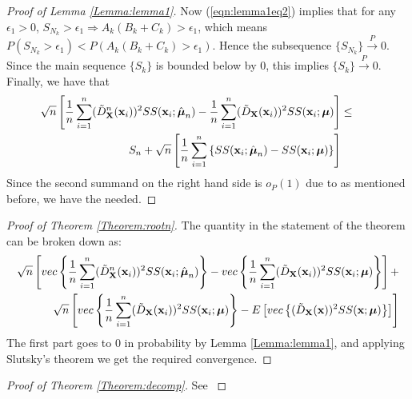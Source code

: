 \documentclass[fleqn,11pt]{article}
\begin{document}
\begin{proof}[Proof of Lemma \ref{Lemma:lemma1}]
Now (\ref{eqn:lemma1eq2}) implies that for any $\epsilon_1 > 0$, $S_{N_k} > \epsilon_1 \Rightarrow A_k (B_k + C_k) > \epsilon_1$, which means $ P(S_{N_k} > \epsilon_1) < P(A_k (B_k + C_k) > \epsilon_1)$. Hence the subsequence $\{S_{N_k}\} \stackrel{P}{\rightarrow} 0$. Since the main sequence $\{S_k\}$ is bounded below by 0, this implies $\{S_k\} \stackrel{P}{\rightarrow} 0$. Finally, we have that
%
\begin{eqnarray}
\sqrt n \left[
\frac{1}{n} \sum_{i=1}^n (\tilde D^n_{\mathbf{X}} ({\bf{x}}_i))^2 SS({\bf{x}}_i; \hat{{\boldsymbol{\mu}}}_n) -
\frac{1}{n} \sum_{i=1}^n (\tilde D_{\mathbf{X}} ({\bf{x}}_i))^2 SS({\bf{x}}_i; {\boldsymbol{\mu}}) \right] &\leq & \hspace{1em} \notag\\
S_n +  \sqrt{n} \left[ \frac{1}{n} \sum_{i=1}^{n} \left\{ SS({\bf{x}}_i; \hat{{\boldsymbol{\mu}}}_{n}) - SS({\bf{x}}_i; {\boldsymbol{\mu}}) \right\} \right] &&
\end{eqnarray}
%
Since the second summand on the right hand side is $o_P(1)$ due to \cite{durre14} as mentioned before, we have the needed.
\end{proof}

\begin{proof}[Proof of Theorem \ref{Theorem:rootn}]
The quantity in the statement of the theorem can be broken down as:
%
\begin{eqnarray*}
\sqrt n \left[ vec\left\{ \frac{1}{n} \sum_{i=1}^n (\tilde D^n_{\mathbf{X}} ({\bf{x}}_i))^2 SS({\bf{x}}_i; \hat{{\boldsymbol{\mu}}}_n) \right\} - vec\left\{ \frac{1}{n} \sum_{i=1}^n (\tilde D_{\mathbf{X}} ({\bf{x}}_i))^2 SS({\bf{x}}_i; {\boldsymbol{\mu}}) \right\} \right] +\\
\sqrt n \left[ vec\left\{ \frac{1}{n} \sum_{i=1}^n (\tilde D_{\mathbf{X}} ({\bf{x}}_i))^2 SS({\bf{x}}_i; {\boldsymbol{\mu}}) \right\} - E \left[ vec\left\{ (\tilde D_{\mathbf{X}} ({\bf{x}}))^2 SS({\bf{x}}; {\boldsymbol{\mu}}) \right\} \right] \right]
\end{eqnarray*}
%
The first part goes to 0 in probability by Lemma \ref{Lemma:lemma1}, and applying Slutsky's theorem we get the required convergence.
\end{proof}

\begin{proof}[Proof of Theorem \ref{Theorem:decomp}]
See \cite{taskinen12}
\end{proof}
\end{document}
